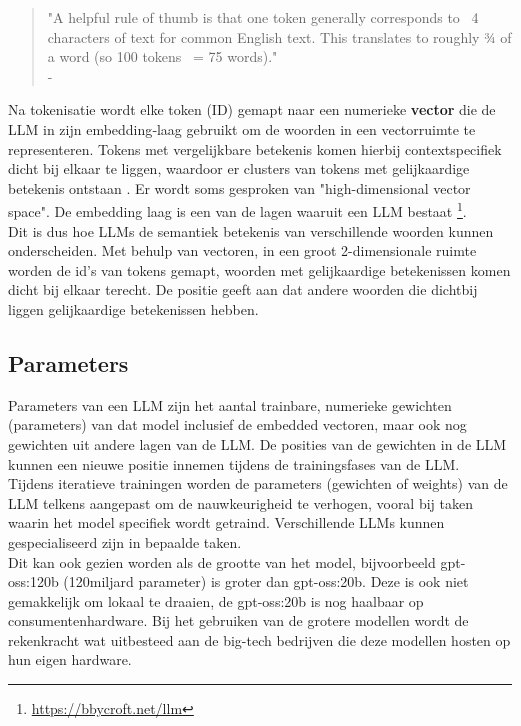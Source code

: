 \begin{quote}
    "A helpful rule of thumb is that one token generally corresponds to ~4 characters of text for common English text. This translates to roughly ¾ of a word (so 100 tokens ~= 75 words)." \\
    - \autocite{OpenAI}
\end{quote}


Na tokenisatie wordt elke token (ID) gemapt naar een numerieke \textbf{vector} die de LLM in zijn embedding‑laag gebruikt om de woorden in een vectorruimte te representeren. Tokens met vergelijkbare betekenis komen hierbij contextspecifiek dicht bij elkaar te liggen, waardoor er clusters van tokens met gelijkaardige betekenis ontstaan \autocite{Hussain2024}.
Er wordt soms gesproken van "high-dimensional vector space". De embedding laag is een van de lagen waaruit een LLM bestaat \footnote{\href{https://bbycroft.net/llm}{https://bbycroft.net/llm}}. \\

Dit is dus hoe LLMs de semantiek betekenis van verschillende woorden kunnen onderscheiden. Met behulp van vectoren, in een groot 2-dimensionale ruimte worden de id's van tokens gemapt, woorden met gelijkaardige betekenissen komen dicht bij elkaar terecht. De positie geeft aan dat andere woorden die dichtbij liggen gelijkaardige betekenissen hebben.

\subsection{Parameters}
\label{ssec:parameters}
Parameters van een LLM zijn het aantal trainbare, numerieke gewichten (parameters) van dat model inclusief de embedded vectoren, maar ook nog gewichten uit andere lagen van de LLM. De posities van de gewichten in de LLM kunnen een nieuwe positie innemen tijdens de trainingsfases van de LLM. \\

Tijdens iteratieve trainingen worden de parameters (gewichten of weights) van de LLM telkens aangepast om de nauwkeurigheid te verhogen, vooral bij taken waarin het model specifiek wordt getraind. Verschillende LLMs kunnen gespecialiseerd zijn in bepaalde taken. \\

Dit kan ook gezien worden als de grootte van het model, bijvoorbeeld gpt-oss:120b (120miljard parameter) is groter dan gpt-oss:20b. Deze is ook niet gemakkelijk om lokaal te draaien, de gpt-oss:20b is nog haalbaar op consumentenhardware. Bij het gebruiken van de grotere modellen wordt de rekenkracht wat uitbesteed aan de big-tech bedrijven die deze modellen hosten op hun eigen hardware.

